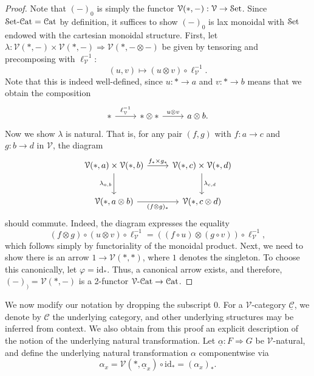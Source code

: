 \begin{proof}
	Note that $(-)_0$ is simply the functor $\mathcal{V} (*,-): \mathcal{V}  \to \mathcal{S}\mathrm{et} $. Since $\mathcal{S}\mathrm{et} \text{-} \mathcal{C}\mathrm{at} =\mathcal{C}\mathrm{at} $ by definition, it suffices to show $(-)_0$ is lax monoidal with $\mathcal{S}\mathrm{et} $ endowed with the cartesian monoidal structure. First, let $\lambda : \mathcal{V} (*,-)\times \mathcal{V} (*,-) \Rightarrow \mathcal{V} (*,-\otimes -)$ be given by tensoring and precomposing with $\ell_\mathcal{V} ^{-1} $:
	\[
		(u,v)\mapsto (u\otimes v)\circ \ell _\mathcal{V} ^{-1} 
	.\]
	Note that this is indeed well-defined, since $u : * \to a$ and $v : * \to b$ means that we obtain the composition
	\[\begin{tikzcd}[row sep = 2.5em, column sep = 2.5em]
		*\ar[" \ell _\mathcal{V} ^{-1}  ", r]  & * \otimes * \ar[" u\otimes v ", r] & a \otimes b.
	\end{tikzcd}\]
	Now we show $\lambda$ is natural. That is, for any pair $(f,g)$ with $f : a \to c$ and $g : b \to d$ in $\mathcal{V} $, the diagram
	\[\begin{tikzcd}[row sep = 2.5em, column sep = 2.5em]
	\mathcal{V} (*,a)\times \mathcal{V} (*,b)\ar[" f_*\times g_* ", r] \ar[" \lambda_{a,b}  "', d]  & \mathcal{V} (*,c)\times \mathcal{V} (*,d)\ar[" \lambda_{c,d}  ", d]  \\
	\mathcal{V} (*,a\otimes b)\ar[" (f\otimes g)_* "', r]  & \mathcal{V} (*,c\otimes d)
	\end{tikzcd}\]
	should commute. Indeed, the diagram expresses the equality
	\[
		(f\otimes g)\circ (u\otimes v)\circ \ell _\mathcal{V} ^{-1} =((f\circ u)\otimes (g\circ v))\circ \ell _\mathcal{V} ^{-1} ,
	\]
	which follows simply by functoriality of the monoidal product. Next, we need to show there is an arrow $1\to \mathcal{V} (*,*)$, where $1$ denotes the singleton. To choose this canonically, let $\varphi=\mathrm{id} _*$. Thus, a canonical arrow exists, and therefore, $(-)_)=\mathcal{V} (*,-)$ is a 2-functor $\mathcal{V} \text{-} \mathcal{C}\mathrm{at} \to \mathcal{C}\mathrm{at} $.
\end{proof}

We now modify our notation by dropping the subscript 0. For a $\mathcal{V} $-category $\underline{\mathcal{C} } $, we denote by $\mathcal{C} $ the underlying category, and other underlying structures may be inferred from context. We also obtain from this proof an explicit description of the notion of the underlying natural transformation. Let $\underline{ \alpha }: F \Rightarrow G$ be $\mathcal{V} $-natural, and define the underlying natural transformation $\alpha$ componentwise via
\[
	\alpha_x = \mathcal{V} (*,\underline{\alpha} _x)\circ \mathrm{id}_* = (\alpha_x)_*
.\]


